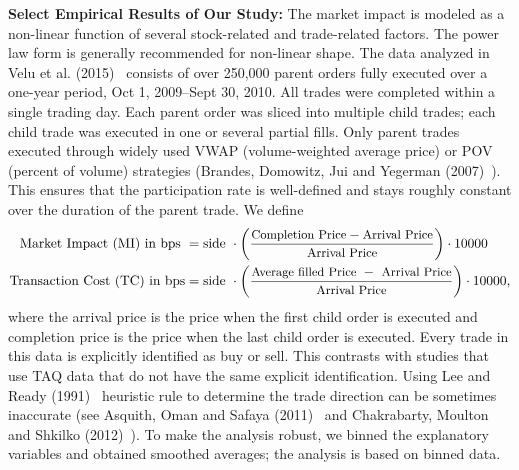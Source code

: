 \noindent\textbf{Select Empirical Results of Our Study:} The market impact is modeled as a non-linear function of several stock-related and trade-related factors. The power law form is generally recommended for non-linear shape. The data analyzed in Velu et al. (2015)~\cite{unpub} consists of over 250,000 parent orders fully executed over a one-year period, Oct 1, 2009--Sept 30, 2010. All trades were completed within a single trading day. Each parent order was sliced into multiple child trades; each child trade was executed in one or several partial fills. Only parent trades executed through widely used VWAP (volume-weighted average price) or POV (percent of volume) strategies (Brandes, Domowitz, Jui and Yegerman (2007)~\cite{brandes2007}). This ensures that the participation rate is well-defined and stays roughly constant over the duration of the parent trade. We define 
	\[
	\begin{split}
	\text{Market Impact (MI) in bps }&= \text{side } \cdot \left(\dfrac{\text{\small Completion Price} - \text{\small Arrival Price}}{\text{\small Arrival Price}}\right) \cdot 10000 \\
	\text{Transaction Cost (TC) in bps}&= \text{side } \cdot \left(\dfrac{\text{\small Average filled Price }-\text{ \small Arrival Price}}{\text{\small Arrival Price}} \right) \cdot 10000 \normalsize,
	\end{split}
	\]
where the arrival price is the price when the first child order is executed and completion price is the price when the last child order is executed. Every trade in this data is explicitly identified as buy or sell. This contrasts with studies that use TAQ data that do not have the same explicit identification. Using Lee and Ready (1991)~\cite{leeready} heuristic rule to determine the trade direction can be sometimes inaccurate (see Asquith, Oman and Safaya (2011)~\cite{asquith2010} and Chakrabarty, Moulton and Shkilko (2012)~\cite{chakrabarty2012short}). To make the analysis robust, we binned the explanatory variables and obtained smoothed averages; the analysis is based on binned data.


